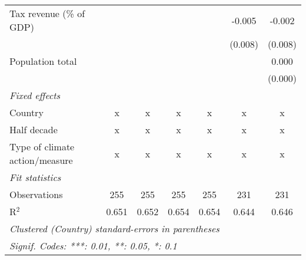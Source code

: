 \begin{tabular}{lcccccc}
   Tax revenue (\% of GDP)                          &         &         &              &              & -0.005        & -0.002\\   
                                                    &         &         &              &              & (0.008)       & (0.008)\\   
   Population total                                 &         &         &              &              &               & 0.000\\   
                                                    &         &         &              &              &               & (0.000)\\   
   \emph{Fixed effects}\\
   Country                                          & x       & x       & x            & x            & x             & x\\  
   Half decade                                      & x       & x       & x            & x            & x             & x\\  
   Type of climate action/measure                   & x       & x       & x            & x            & x             & x\\  
   \midrule \emph{Fit statistics}\\
   Observations                                     & 255     & 255     & 255          & 255          & 231           & 231\\  
   R$^2$                                            & 0.651   & 0.652   & 0.654        & 0.654        & 0.644         & 0.646\\  
   \midrule
   \multicolumn{7}{l}{\emph{Clustered (Country) standard-errors in parentheses}}\\
   \multicolumn{7}{l}{\emph{Signif. Codes: ***: 0.01, **: 0.05, *: 0.1}}\\
\end{tabular}
\par\endgroup


